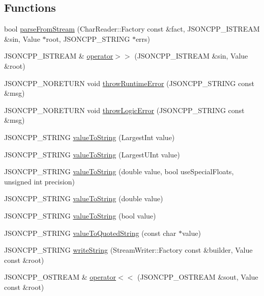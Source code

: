 \subsection*{Functions}
\begin{DoxyCompactItemize}
\item 
bool \hyperlink{namespace_json_a38f903cfdb57a6c4e86a7dcc42f3712c}{parse\+From\+Stream} (Char\+Reader\+::\+Factory const \&fact, J\+S\+O\+N\+C\+P\+P\+\_\+\+I\+S\+T\+R\+E\+A\+M \&sin, Value $\ast$root, J\+S\+O\+N\+C\+P\+P\+\_\+\+S\+T\+R\+I\+N\+G $\ast$errs)
\item 
J\+S\+O\+N\+C\+P\+P\+\_\+\+I\+S\+T\+R\+E\+A\+M \& \hyperlink{namespace_json_a52b40333cc8aa17c82ac359462ce691b}{operator$>$$>$} (J\+S\+O\+N\+C\+P\+P\+\_\+\+I\+S\+T\+R\+E\+A\+M \&sin, Value \&root)
\item 
J\+S\+O\+N\+C\+P\+P\+\_\+\+N\+O\+R\+E\+T\+U\+R\+N void \hyperlink{namespace_json_a0ab7ff7f99788262d92d9ff3d924e065}{throw\+Runtime\+Error} (J\+S\+O\+N\+C\+P\+P\+\_\+\+S\+T\+R\+I\+N\+G const \&msg)
\item 
J\+S\+O\+N\+C\+P\+P\+\_\+\+N\+O\+R\+E\+T\+U\+R\+N void \hyperlink{namespace_json_a27790f21f17922fac81e7cd72a5659a5}{throw\+Logic\+Error} (J\+S\+O\+N\+C\+P\+P\+\_\+\+S\+T\+R\+I\+N\+G const \&msg)
\item 
J\+S\+O\+N\+C\+P\+P\+\_\+\+S\+T\+R\+I\+N\+G \hyperlink{namespace_json_a4732517cb28d203cfd4354d05952a81b}{value\+To\+String} (Largest\+Int value)
\item 
J\+S\+O\+N\+C\+P\+P\+\_\+\+S\+T\+R\+I\+N\+G \hyperlink{namespace_json_a6283ea3db02efe9104ae6baff698245a}{value\+To\+String} (Largest\+U\+Int value)
\item 
J\+S\+O\+N\+C\+P\+P\+\_\+\+S\+T\+R\+I\+N\+G \hyperlink{namespace_json_a41f0a9fca69a534a8646ce0123683a8b}{value\+To\+String} (double value, bool use\+Special\+Floats, unsigned int precision)
\item 
J\+S\+O\+N\+C\+P\+P\+\_\+\+S\+T\+R\+I\+N\+G \hyperlink{namespace_json_a3cf0c8dbbdb898c4a6fad54670b34bd1}{value\+To\+String} (double value)
\item 
J\+S\+O\+N\+C\+P\+P\+\_\+\+S\+T\+R\+I\+N\+G \hyperlink{namespace_json_a0a706a1fffba4fe8a8c1ef75b2dbbfab}{value\+To\+String} (bool value)
\item 
J\+S\+O\+N\+C\+P\+P\+\_\+\+S\+T\+R\+I\+N\+G \hyperlink{namespace_json_aaf777a6923bcb4cf63a2729973fe5315}{value\+To\+Quoted\+String} (const char $\ast$value)
\item 
J\+S\+O\+N\+C\+P\+P\+\_\+\+S\+T\+R\+I\+N\+G \hyperlink{namespace_json_a2fedf74e669b85f356f2c00973172ce7}{write\+String} (Stream\+Writer\+::\+Factory const \&builder, Value const \&root)
\item 
J\+S\+O\+N\+C\+P\+P\+\_\+\+O\+S\+T\+R\+E\+A\+M \& \hyperlink{namespace_json_a0f440d134f8bab9725aa31cb9704d6af}{operator$<$$<$} (J\+S\+O\+N\+C\+P\+P\+\_\+\+O\+S\+T\+R\+E\+A\+M \&sout, Value const \&root)
\end{DoxyCompactItemize}
